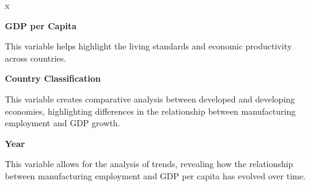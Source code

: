 x\documentclass[12pt]{article}
\begin{document}
    \item \textbf{GDP per Capita}  
    
This variable helps highlight the living standards and economic productivity across countries.

    \item \textbf{Country Classification}  
    
This variable creates comparative analysis between developed and developing economies, highlighting differences in the relationship between manufacturing employment and GDP growth.

    \item \textbf{Year}  
    
This variable allows for the analysis of trends, revealing how the relationship between manufacturing employment and GDP per capita has evolved over time.
\end{document}
